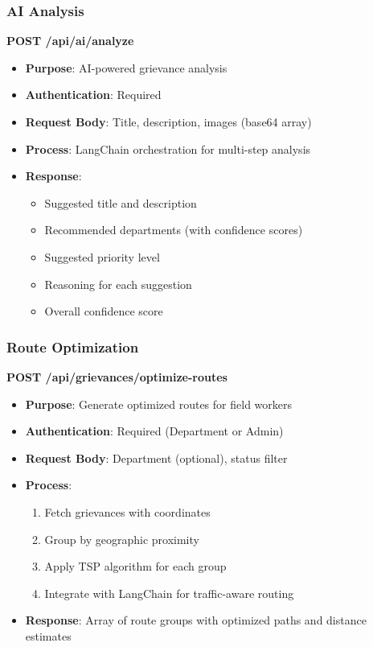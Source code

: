 \documentclass[12pt,a4paper]{article}
\begin{document}
\subsubsection{AI Analysis}

\textbf{POST /api/ai/analyze}
\begin{itemize}
    \item \textbf{Purpose}: AI-powered grievance analysis
    \item \textbf{Authentication}: Required
    \item \textbf{Request Body}: Title, description, images (base64 array)
    \item \textbf{Process}: LangChain orchestration for multi-step analysis
    \item \textbf{Response}: 
    \begin{itemize}
        \item Suggested title and description
        \item Recommended departments (with confidence scores)
        \item Suggested priority level
        \item Reasoning for each suggestion
        \item Overall confidence score
    \end{itemize}
\end{itemize}

\subsubsection{Route Optimization}

\textbf{POST /api/grievances/optimize-routes}
\begin{itemize}
    \item \textbf{Purpose}: Generate optimized routes for field workers
    \item \textbf{Authentication}: Required (Department or Admin)
    \item \textbf{Request Body}: Department (optional), status filter
    \item \textbf{Process}:
    \begin{enumerate}
        \item Fetch grievances with coordinates
        \item Group by geographic proximity
        \item Apply TSP algorithm for each group
        \item Integrate with LangChain for traffic-aware routing
    \end{enumerate}
    \item \textbf{Response}: Array of route groups with optimized paths and distance estimates
\end{itemize}
\end{document}
